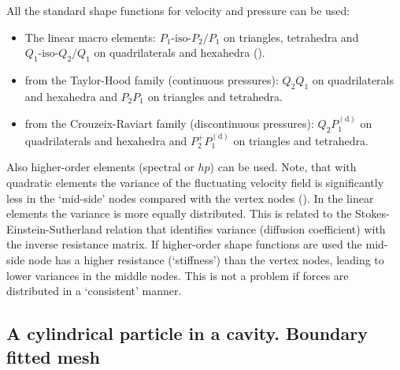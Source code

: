 All the standard shape functions for velocity and pressure can be used:
\begin{itemize}
\item
The linear macro elements:
$P_1\text{-iso-}P_2/P_1$ on triangles, tetrahedra and 
$Q_1\text{-iso-}Q_2/Q_1$ on quadrilaterals and hexahedra (\cite{Bercovier79}).
 \item from the Taylor-Hood
family (continuous pressures): $Q_2Q_1$ on quadrilaterals and hexahedra and
$P_2P_1$ on triangles and tetrahedra.
 \item from the Crouzeix-Raviart
family (discontinuous pressures): $Q_2P_1^{(\text{d})}$ on quadrilaterals
and hexahedra and $P_2^+P_1^{(\text{d})}$ on triangles and tetrahedra.
\end{itemize}
Also higher-order elements (spectral or $hp$) can be used.
Note, that with quadratic elements the variance of the fluctuating
velocity field is significantly less in the `mid-side' nodes compared with the
vertex nodes (\cite{DeCorato2016}). In the linear elements the variance is more
equally distributed. This is related to the Stokes-Einstein-Sutherland relation
that identifies variance (diffusion coefficient) with the inverse resistance
matrix. If higher-order shape functions are used the mid-side node has a higher
resistance (`stiffness') than the vertex nodes, leading to lower variances in
the middle nodes. This is not a problem if forces are distributed in a
`consistent' manner.

\subsection{A cylindrical particle in a cavity. Boundary fitted mesh}

\label{sec:brown1}

